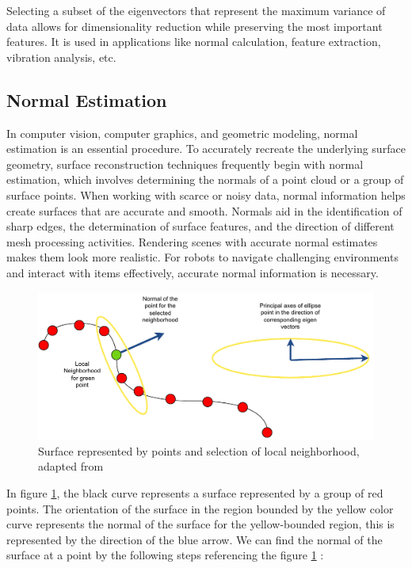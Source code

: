 Selecting a subset of the eigenvectors that represent the maximum variance of data allows for dimensionality reduction while preserving the most important features. It is used in applications like normal calculation, feature extraction, vibration analysis, etc.

\subsection{Normal Estimation}
In computer vision, computer graphics, and geometric modeling, normal estimation is an essential procedure. To accurately recreate the underlying surface geometry, surface reconstruction techniques frequently begin with normal estimation, which involves determining the normals of a point cloud or a group of surface points. When working with scarce or noisy data, normal information helps create surfaces that are accurate and smooth. Normals aid in the identification of sharp edges, the determination of surface features, and the direction of different mesh processing activities. Rendering scenes with accurate normal estimates makes them look more realistic. For robots to navigate challenging environments and interact with items effectively, accurate normal information is necessary.

\begin{figure}[htbp]
    \centering
    \includegraphics[width=0.5\linewidth]{97_graphics//related_work/normal_estimation.pdf}
    \caption{Surface represented by points and selection of local neighborhood, adapted from \parencite{normal_estimation}}
    \label{fig:related_work-normal_estimation}
\end{figure}

In figure \ref{fig:related_work-normal_estimation}, the black curve represents a surface represented by a group of red points. The orientation of the surface in the region bounded by the yellow color curve represents the normal of the surface for the yellow-bounded region, this is represented by the direction of the blue arrow. We can find the normal of the surface at a point by the following steps \parencite{normal_estimation} referencing the figure \ref{fig:related_work-normal_estimation} :

